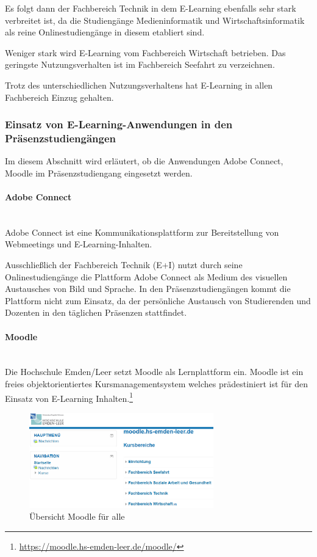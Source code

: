 Es folgt dann der Fachbereich Technik in dem E-Learning ebenfalls sehr stark verbreitet ist, da die Studiengänge Medieninformatik und Wirtschaftsinformatik als reine Onlinestudiengänge in diesem etabliert sind.

Weniger stark wird E-Learning vom Fachbereich Wirtschaft betrieben. Das geringste Nutzungsverhalten ist im Fachbereich Seefahrt zu verzeichnen.

Trotz des unterschiedlichen Nutzungsverhaltens hat E-Learning in allen Fachbereich Einzug gehalten.

\subsubsection[Einsatz von E-Learning-Anwendungen]{Einsatz von E-Learning-Anwendungen in den Präsenzstudiengängen}
Im diesem Abschnitt wird erläutert, ob die Anwendungen Adobe Connect, Moodle im Präsenzstudiengang eingesetzt werden.

\paragraph{Adobe Connect}\mbox{} \\
Adobe Connect ist eine Kommunikationsplattform zur Bereitstellung von Webmeetings und E-Learning-Inhalten.

Ausschließlich der Fachbereich Technik (E+I) nutzt durch seine Onlinestudiengänge die Plattform Adobe Connect als Medium des visuellen Austausches von Bild und Sprache. In den Präsenzstudiengängen kommt die Plattform nicht zum Einsatz, da der persönliche Austausch von Studierenden und Dozenten in den täglichen Präsenzen stattfindet.

\paragraph{Moodle}\mbox{} \\
Die Hochschule Emden/Leer setzt Moodle als Lernplattform ein. Moodle ist ein freies objektorientiertes Kursmanagementsystem welches prädestiniert ist für den Einsatz von E-Learning Inhalten.\footnote{\url{https://moodle.hs-emden-leer.de/moodle/}}

\begin{figure}[h!]
	\centering
	\includegraphics[width=8cm]{kapitel/gruppe2/bilder/moodle}
	\caption{Übersicht Moodle für alle}
	\label{fig_moodle}
\end{figure}

